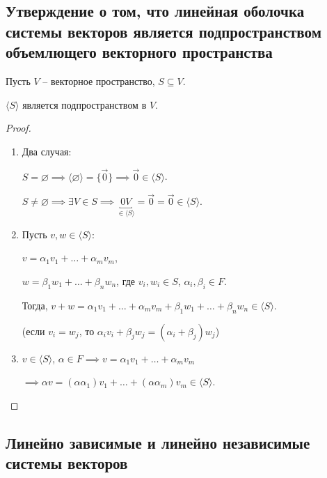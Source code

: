 \subsection{Утверждение о том, что линейная оболочка системы векторов является подпространством объемлющего векторного пространства}

Пусть $V$ -- векторное пространство, $S \subseteq V$.

\begin{proposal}
    $\langle S \rangle$ является подпространством в $V$.
\end{proposal}

\begin{proof}~
    \begin{enumerate}
    \item 
        Два случая:

        $S = \varnothing \implies \langle \varnothing \rangle = \{\overrightarrow{0}\} \implies \overrightarrow{0} \in \langle S \rangle$.

        $S \neq \varnothing \implies \exists V \in S \implies \underbracket{0 V}_{\in \langle S \rangle} = \overrightarrow{0} = \overrightarrow{0} \in \langle S \rangle$.

    \item 
        Пусть $v, w \in \langle S \rangle$:

        $v = \alpha_1 v_1 + \dots + \alpha_m v_m$,

        $w = \beta_1 w_1 + \dots + \beta_n w_n$, где $v_i, w_i \in S$, $\alpha_i, \beta_i \in F$.

        Тогда, $v + w = \alpha_1 v_1 + \dots + \alpha_m v_m + \beta_1 w_1 + \dots + \beta_n w_n \in \langle S \rangle$.

        (если $v_i = w_j$, то $\alpha_i v_i + \beta_j w_j = (\alpha_i + \beta_j) w_j$)

    \item
        $v \in \langle S \rangle$, $\alpha \in F \implies v = \alpha_1 v_1 + \dots + \alpha_m v_m$

        $\implies \alpha v = (\alpha \alpha_1) v_1 + \dots + (\alpha \alpha_m) v_m \in \langle S \rangle$. \qedhere
    \end{enumerate}
\end{proof}


\subsection{Линейно зависимые и линейно независимые системы векторов}

